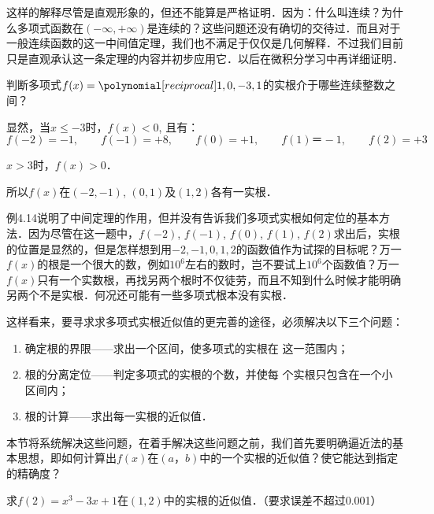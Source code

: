 这样的解释尽管是直观形象的，但还不能算是严格证明．因为：什么叫连续？为什么多项式函数在$(-\infty,+\infty)$是连续的？这些问题还没有确切的交待过．而且对于一般连续函数的这一中间值定理，我们也不满足于仅仅是几何解释．不过我们目前只是直观承认这一条定理的内容并初步应用它．以后在微积分学习中再详细证明．

\begin{example}
    判断多项式$f(x)=\poly{1,0,-3,1}$的实根介于哪些连续整数之间？
\end{example}

\begin{solution}
显然，当$x\le -3$时，$f(x)<0$, 且有：
\[f (-2) =-1,\qquad f (-1) =+8,\qquad f (0) =+1,\qquad f (1)＝-1,\qquad f(2)=+3\]

$x>3$时，$f(x)>0$．

所以$f(x)$在$(-2,-1)$, $(0, 1)$及$(1, 2)$各有一实根．
\end{solution}
    
例4.14说明了中间定理的作用，但并没有告诉我们多项式实根如何定位的基本方法．因为尽管在这一题中，$f(-2)$, $f(-1)$, $f(0)$, $f(1)$, $f(2)$求出后，实根的位置是显然的，但是怎样想到用$-2,-1, 0, 1, 2$的函数值作为试探的目标呢？万一$f(x)$的根是一个很大的数，例如$10^6$左右的数时，岂不要试上$10^6$个函数值？万一$f(x)$只有一个实数根，再找另两个根时不仅徒劳，而且不知到什么时候才能明确另两个不是实根．何况还可能有一些多项式根本没有实根．

这样看来，要寻求求多项式实根近似值的更完善的途径，必须解决以下三个问题：
\begin{enumerate}
\item 确定根的界限——求出一个区间，使多项式的实根在
这一范围内；    
\item 根的分离定位——判定多项式的实根的个数，并使每
个实根只包含在一个小区间内；    
\item 根的计算——求出每一实根的近似值．
\end{enumerate}

本节将系统解决这些问题，在着手解决这些问题之前，我们首先要明确逼近法的基本思想，即如何计算出$f(x)$在$(a，b)$中的一个实根的近似值？使它能达到指定的精确度？

\begin{example}
    求$f(2)=x^3-3x+1$在$(1, 2)$中的实根的近似值．（要求误差不超过0.001）
\end{example}

